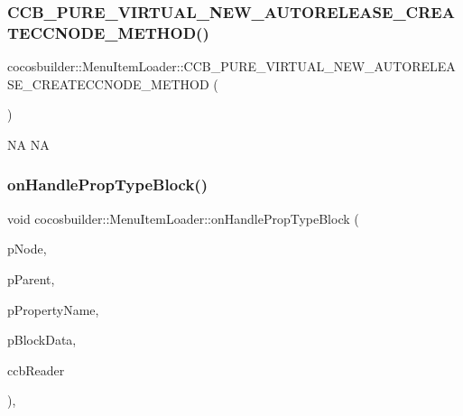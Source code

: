 \subsubsection{\texorpdfstring{C\+C\+B\+\_\+\+P\+U\+R\+E\+\_\+\+V\+I\+R\+T\+U\+A\+L\+\_\+\+N\+E\+W\+\_\+\+A\+U\+T\+O\+R\+E\+L\+E\+A\+S\+E\+\_\+\+C\+R\+E\+A\+T\+E\+C\+C\+N\+O\+D\+E\+\_\+\+M\+E\+T\+H\+O\+D()}{CCB\_PURE\_VIRTUAL\_NEW\_AUTORELEASE\_CREATECCNODE\_METHOD()}\hspace{0.1cm}{\footnotesize\ttfamily [2/2]}}
{\footnotesize\ttfamily cocosbuilder\+::\+Menu\+Item\+Loader\+::\+C\+C\+B\+\_\+\+P\+U\+R\+E\+\_\+\+V\+I\+R\+T\+U\+A\+L\+\_\+\+N\+E\+W\+\_\+\+A\+U\+T\+O\+R\+E\+L\+E\+A\+S\+E\+\_\+\+C\+R\+E\+A\+T\+E\+C\+C\+N\+O\+D\+E\+\_\+\+M\+E\+T\+H\+OD (\begin{DoxyParamCaption}\item[{cocos2d\+::\+Menu\+Item}]{ }\end{DoxyParamCaption})\hspace{0.3cm}{\ttfamily [protected]}}

NA  NA \mbox{\label{classcocosbuilder_1_1MenuItemLoader_ad65759938217df7461994000378b82ba}} 
\subsubsection{\texorpdfstring{on\+Handle\+Prop\+Type\+Block()}{onHandlePropTypeBlock()}\hspace{0.1cm}{\footnotesize\ttfamily [1/2]}}
{\footnotesize\ttfamily void cocosbuilder\+::\+Menu\+Item\+Loader\+::on\+Handle\+Prop\+Type\+Block (\begin{DoxyParamCaption}\item[{cocos2d\+::\+Node $\ast$}]{p\+Node,  }\item[{cocos2d\+::\+Node $\ast$}]{p\+Parent,  }\item[{const char $\ast$}]{p\+Property\+Name,  }\item[{\hyperlink{structcocosbuilder_1_1BlockData}{Block\+Data} $\ast$}]{p\+Block\+Data,  }\item[{\hyperlink{classcocosbuilder_1_1CCBReader}{C\+C\+B\+Reader} $\ast$}]{ccb\+Reader }\end{DoxyParamCaption})\hspace{0.3cm}{\ttfamily [protected]}, {\ttfamily [virtual]}}

